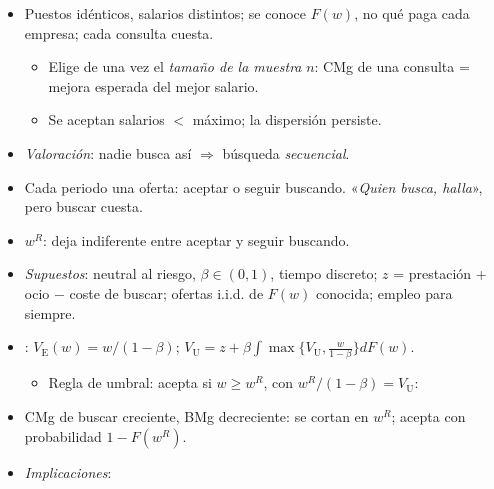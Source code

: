 \documentclass{article}
\begin{document}
\begin{columnas}
\begin{itemize}
\item Puestos idénticos, salarios distintos; se conoce $F(w)$, no qué paga cada empresa; cada consulta cuesta.
  \begin{itemize}
  \item Elige de una vez el \emph{tamaño de la muestra} $n$: CMg de una consulta = mejora esperada del mejor salario.
  \item Se aceptan salarios $<$ máximo; la dispersión persiste.
  \end{itemize}
\item \emph{Valoración}: nadie busca así $\Rightarrow$ búsqueda \emph{secuencial}.
\end{itemize}

\begin{itemize}
\item Cada periodo una oferta: aceptar o seguir buscando. «\emph{Quien busca, halla}», pero buscar cuesta.
\item {} $w^R$: deja indiferente entre aceptar y seguir buscando.
\end{itemize}
\begin{itemize}
\item \emph{Supuestos}: neutral al riesgo, $\beta\in(0,1)$, tiempo discreto; $z$ = prestación + ocio $-$ coste de buscar; ofertas i.i.d. de $F(w)$ conocida; empleo para siempre.
\item \emph{}: $V_{\mathrm E}(w)=w/(1-\beta)$; $V_{\mathrm U}=z+\beta\int\max\{V_{\mathrm U},\tfrac{w}{1-\beta}\}dF(w)$.
  \begin{itemize}
  \item Regla de umbral: acepta si $w\geq w^R$, con $w^R/(1-\beta)=V_{\mathrm U}$:
  \end{itemize}
\item CMg de buscar creciente, BMg decreciente: se cortan en $w^R$; acepta con probabilidad $1-F(w^R)$.
\end{itemize}
\begin{itemize}
\item \emph{Implicaciones}:

\end{itemize}
\end{columnas}
\end{document}

